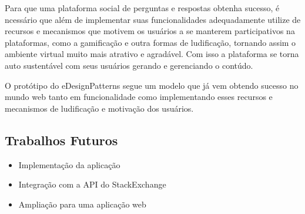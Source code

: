 Para que uma plataforma social de perguntas e respostas obtenha sucesso, é ncessário que além de implementar suas funcionalidades adequadamente
 utilize de recursos e mecanismos que motivem os usuários a se manterem participativos na plataformas, como a gamificação e outra formas de
 ludificação, tornando assim o ambiente virtual muito mais atrativo e agradável. Com isso a plataforma se torna auto sustentável com seus usuários
 gerando e gerenciando o contúdo.

O protótipo do eDesignPatterns segue um modelo que já vem obtendo sucesso no mundo web tanto em funcionalidade como implementando esses recursos
 e mecanismos de ludificação e motivação dos usuários. 

\subsection{Trabalhos Futuros}

\begin{itemize}
 \item Implementação da aplicação
 \item Integração com a API do StackExchange
 \item Ampliação para uma aplicação web
\end{itemize}
